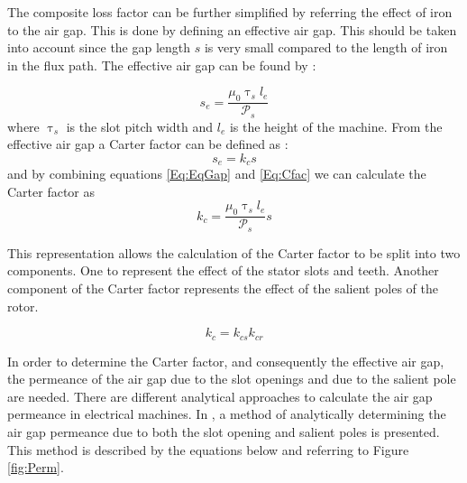 The composite loss factor can be further simplified by referring the effect of iron to the air gap. This is done by defining an effective air gap. This should be taken into account since the gap length $s$ is very small compared to the length of iron in the flux path. The effective air gap can be found by \cite{IntACMach}:

\begin{equation}\label{Eq:EqGap}
	{s}_{e}=\frac{{\mu}_{0}{\uptau}_{s}{l}_{e}}{\mathcal{P}_{s}}
\end{equation}
where ${\uptau}_{s}$ is the slot pitch width and ${l}_{e}$ is the height of the machine. From the effective air gap a Carter factor can be defined as \cite{IntACMach}:
\begin{equation}\label{Eq:Cfac}
	{s}_{e}={k}_{c}s
\end{equation}
and by combining equations \ref{Eq:EqGap} and \ref{Eq:Cfac} we can calculate the Carter factor as
\begin{equation}\label{Eq:CfacwP}
	{k}_{c}=\frac{{\mu}_{0}{\uptau}_{s}{l}_{e}}{\mathcal{P}_{s}}s
\end{equation}

This representation allows the calculation of the Carter factor to be split into two components. One to represent the effect of the stator slots and teeth. Another component of the Carter factor represents the effect of the salient poles of the rotor.

\begin{equation}\label{Eq:Cfacwrs}
	{k}_{c}={k}_{cs}{k}_{cr}
\end{equation}

In order to determine the Carter factor, and consequently the effective air gap, the permeance of the air gap due to the slot openings and due to the salient pole are needed. There are different analytical approaches to calculate the air gap permeance in electrical machines. In \cite{AnaGapSal}, a method of analytically determining the air gap permeance due to both the slot opening and salient poles is presented. This method is described by the equations below and referring to Figure \ref{fig:Perm}.


